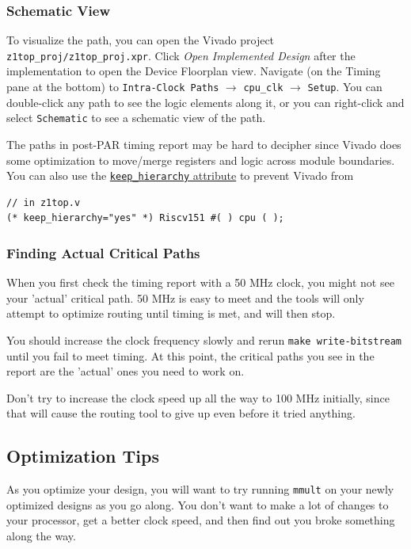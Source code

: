 \documentclass[11pt]{article}
\begin{document}
\subsubsection{Schematic View}
To visualize the path, you can open the Vivado project \verb|z1top_proj/z1top_proj.xpr|.
Click \textit{Open Implemented Design} after the implementation to open the Device Floorplan view.
Navigate (on the Timing pane at the bottom) to \verb|Intra-Clock Paths| $\rightarrow$ \verb|cpu_clk| $\rightarrow$ \verb|Setup|.
You can double-click any path to see the logic elements along it, or you can right-click and select \verb|Schematic| to see a schematic view of the path.

The paths in post-PAR timing report may be hard to decipher since Vivado does some optimization to move/merge registers and logic across module boundaries.
You can also use the \href{https://www.xilinx.com/support/answers/54778.html}{\texttt{keep\_hierarchy} attribute} to prevent Vivado from 

\begin{verbatim}
// in z1top.v
(* keep_hierarchy="yes" *) Riscv151 #( ) cpu ( );
\end{verbatim}

\subsubsection{Finding Actual Critical Paths}
When you first check the timing report with a 50 MHz clock, you might not see your 'actual' critical path.
50 MHz is easy to meet and the tools will only attempt to optimize routing until timing is met, and will then stop.

You should increase the clock frequency slowly and rerun \verb|make write-bitstream| until you fail to meet timing.
At this point, the critical paths you see in the report are the 'actual' ones you need to work on.

Don't try to increase the clock speed up all the way to 100 MHz initially, since that will cause the routing tool to give up even before it tried anything.

\subsection{Optimization Tips}
As you optimize your design, you will want to try running \verb|mmult| on your newly optimized designs as you go along. You don't want to make a lot of changes to your processor, get a better clock speed, and then find out you broke something along the way.
\end{document}
